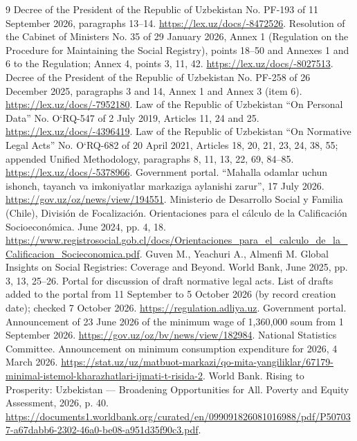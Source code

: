 \documentclass[14pt,a4paper]{extarticle}
\newcommand{\tsize}{\fontsize{12bp}{14.4bp}\selectfont}
\begin{document}
\begingroup\tsize
\begin{thebibliography}{9}
 Decree of the President of the Republic of Uzbekistan No. PF-193 of 11 September 2026, paragraphs 13–14. \url{https://lex.uz/docs/-8472526}.
 Resolution of the Cabinet of Ministers No. 35 of 29 January 2026, Annex 1 (Regulation on the Procedure for Maintaining the Social Registry), points 18–50 and Annexes 1 and 6 to the Regulation; Annex 4, points 3, 11, 42. \url{https://lex.uz/docs/-8027513}.
 Decree of the President of the Republic of Uzbekistan No. PF-258 of 26 December 2025, paragraphs 3 and 14, Annex 1 and Annex 3 (item 6). \url{https://lex.uz/docs/-7952180}.
 Law of the Republic of Uzbekistan “On Personal Data” No. O‘RQ-547 of 2 July 2019, Articles 11, 24 and 25. \url{https://lex.uz/docs/-4396419}.
 Law of the Republic of Uzbekistan “On Normative Legal Acts” No. O‘RQ-682 of 20 April 2021, Articles 18, 20, 21, 23, 24, 38, 55; appended Unified Methodology, paragraphs 8, 11, 13, 22, 69, 84–85. \url{https://lex.uz/docs/-5378966}.
 Government portal. “Mahalla odamlar uchun ishonch, tayanch va imkoniyatlar markaziga aylanishi zarur”, 17 July 2026. \url{https://gov.uz/oz/news/view/194551}.
 Ministerio de Desarrollo Social y Familia (Chile), División de Focalización. Orientaciones para el cálculo de la Calificación Socioeconómica. June 2024, pp. 4, 18. \url{https://www.registrosocial.gob.cl/docs/Orientaciones_para_el_calculo_de_la_Calificacion_Socieconomica.pdf}.
 Guven M., Yeachuri A., Almenfi M. Global Insights on Social Registries: Coverage and Beyond. World Bank, June 2025, pp. 3, 13, 25–26.
 Portal for discussion of draft normative legal acts. List of drafts added to the portal from 11 September to 5 October 2026 (by record creation date); checked 7 October 2026. \url{https://regulation.adliya.uz}.
 Government portal. Announcement of 23 June 2026 of the minimum wage of 1,360,000 soum from 1 September 2026. \url{https://gov.uz/oz/bv/news/view/182984}.
 National Statistics Committee. Announcement on minimum consumption expenditure for 2026, 4 March 2026. \url{https://stat.uz/uz/matbuot-markazi/qo-mita-yangiliklar/67179-minimal-istemol-kharazhatlari-ijmati-t-risida-2}.
 World Bank. Rising to Prosperity: Uzbekistan — Broadening Opportunities for All. Poverty and Equity Assessment, 2026, p. 40. \url{https://documents1.worldbank.org/curated/en/099091826081016988/pdf/P507037-a67dabb6-2302-46a0-be08-a951d35f90c3.pdf}.

\end{thebibliography}
\end{document}
